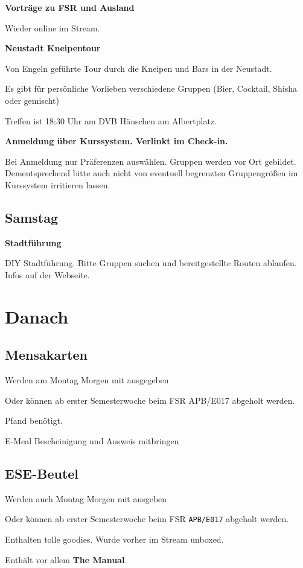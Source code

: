 \documentclass[a4paper,12pt]{scrreprt}
\begin{document}
\textbf{Vorträge zu FSR und Ausland}
\begin{itemize*}
    \item Wieder online im Stream.
\end{itemize*}


\textbf{Neustadt Kneipentour}
\begin{itemize*}
    \item Von Engeln geführte Tour durch die Kneipen und Bars in der Neustadt.
    \item Es gibt für persönliche Vorlieben verschiedene Gruppen (Bier, Cocktail, Shisha oder gemischt)
    \item Treffen ist 18:30 Uhr am DVB Häuschen am Albertplatz.
    \item \textbf{Anmeldung über Kurssystem. Verlinkt im Check-in.}
    \item Bei Anmeldung nur Präferenzen auswählen. Gruppen werden vor Ort gebildet. Dementsprechend bitte auch nicht von eventuell begrenzten Gruppengrößen im Kurssystem irritieren lassen.
\end{itemize*}


\subsection{Samstag}

\textbf{Stadtführung}
\begin{itemize*}
    \item DIY Stadtführung. Bitte Gruppen suchen und bereitgestellte Routen ablaufen. Infos auf der Webseite.
\end{itemize*}

\section{Danach}
\subsection{Mensakarten}
\begin{itemize*}
    \item Werden am Montag Morgen mit ausgegeben
    \item Oder können ab erster Semesterwoche beim FSR APB/E017 abgeholt werden.
    \item {} Pfand benötigt.
    \item E-Meal Bescheinigung und Ausweis mitbringen
\end{itemize*}

\subsection{ESE-Beutel}
\begin{itemize*}
    \item Werden auch Montag Morgen mit ausgeben
    \item Oder können ab erster Semesterwoche beim FSR \texttt{APB/E017} abgeholt werden.
    \item Enthalten tolle goodies. Wurde vorher im Stream unboxed.
    \item Enthält vor allem \textbf{The Manual}.
\end{itemize*}
\end{document}
